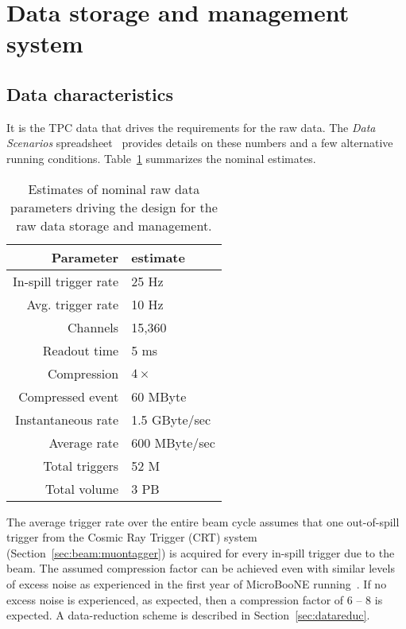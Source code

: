 \section{Data storage and management system}

\subsection{Data characteristics}

It is the TPC data that drives the requirements for the raw \pdsp data.
The \textit{\pdsp Data Scenarios} spreadsheet~\cite{data_spreadsheet}  %
provides details on these %
numbers and a few alternative running conditions.
Table~\ref{tab:goldi} summarizes the nominal estimates.

\begin{table}[h]
  \centering
  \begin{tabular}[h]{|r|l|}
    \hline
    Parameter & estimate  \\
    \hline
    In-spill trigger rate & 25 Hz \\
    Avg. trigger rate & 10 Hz \\
    Channels & 15,360 \\
    Readout time & 5 ms \\
    Compression & $4\times$ \\
    \hline
    Compressed event & 60 MByte  \\
    Instantaneous rate & 1.5 GByte/sec \\
    Average rate & 600 MByte/sec \\
    \hline
    Total triggers & 52 M \\
    Total volume & 3 PB  \\
    \hline
  \end{tabular}
  \caption{Estimates of nominal raw data parameters driving the design for the raw data storage and management.}
  \label{tab:goldi}
\end{table}

The average trigger rate over the entire beam cycle assumes that one
out-of-spill trigger from the Cosmic Ray Trigger (CRT) system (Section~\ref{sec:beam:muontagger}) 
is acquired
for every in-spill trigger due to the beam.  The assumed compression
factor can be achieved even with similar levels of excess noise as
experienced in the first year of MicroBooNE running~\cite{docdb2089}.
If no excess noise is experienced, as expected, then a compression factor
of 6 -- 8 is expected.  A data-reduction scheme is described in
Section~\ref{sec:datareduc}.



